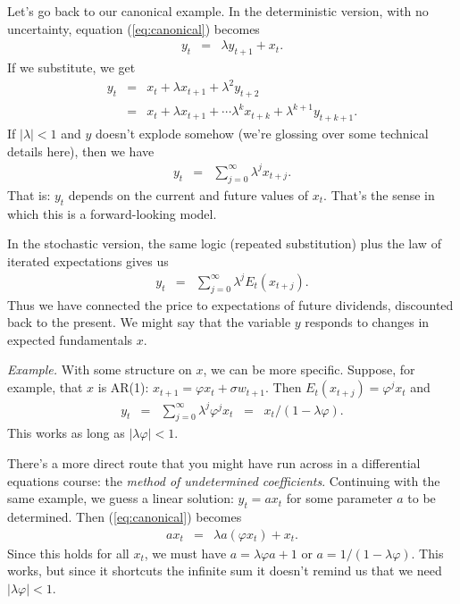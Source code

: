 \documentclass[11pt]{article}
\begin{document}
Let's go back to our canonical example.
In the deterministic version, with no uncertainty,
equation (\ref{eq:canonical}) becomes
\begin{eqnarray*}
    y_t &=&  \lambda y_{t+1} + x_{t} .
\end{eqnarray*}
If we substitute, we get
\begin{eqnarray*}
    y_t &=&  x_t + \lambda x_{t+1} + \lambda^2 y_{t+2}  \\
        &=&  x_t + \lambda x_{t+1} + \cdots \lambda^k x_{t+k} + \lambda^{k+1} y_{t+k+1} .
\end{eqnarray*}
If $|\lambda | < 1$ and $y$ doesn't explode somehow (we're glossing over some technical details here),
then we have
\begin{eqnarray*}
    y_t &=&  \sum_{j=0}^\infty \lambda^j x_{t+j} .
\end{eqnarray*}
That is:  $y_t$ depends on the current and future values of $x_t$.
That's the sense in which this is a forward-looking model.

In the stochastic version, the same logic (repeated substitution)
plus the law of iterated expectations gives us
\begin{eqnarray}
    y_t &=&  \sum_{j=0}^\infty \lambda^j E_t (x_{t+j}) .
    \label{eq:canonical-solution}
\end{eqnarray}
Thus we have connected the price to expectations of future dividends,
discounted back to the present.
We might say that the variable $y$ responds to changes in expected fundamentals $x$.


{\it Example.\/}
With some structure on $x$, we can be more specific.
Suppose, for example, that $x$ is AR(1):
$ x_{t+1} = \varphi x_t + \sigma w_{t+1}$.
Then $ E_t (x_{t+j}) = \varphi^j x_t $ and
\begin{eqnarray*}
    y_t &=&  \sum_{j=0}^\infty \lambda^j \varphi^j x_t
            \;\;=\;\; x_t /(1- \lambda \varphi).
\end{eqnarray*}
This works as long as $ |\lambda \varphi | < 1$.

There's a more direct route that you might have run across in
a differential equations course:  the {\it method of undetermined coefficients\/}.
Continuing with the same example,
we guess a linear solution:  $ y_t = a x_t$ for some parameter $a$ to be determined.
Then (\ref{eq:canonical}) becomes
\begin{eqnarray*}
    a x_t &=& \lambda a (\varphi x_t) + x_t .
\end{eqnarray*}
Since this holds for all $x_t$, we must have
$ a = \lambda \varphi a + 1 $ or $ a = 1/(1-\lambda \varphi)$.
This works, but since it shortcuts the infinite sum it doesn't remind
us that we need $ |\lambda \varphi | < 1 $.
\end{document}
